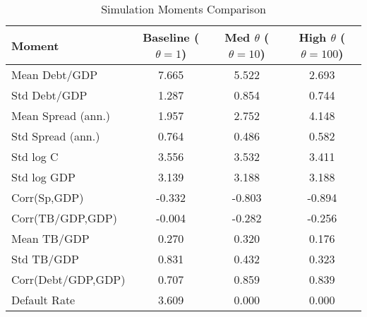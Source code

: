 \documentclass{article}
\begin{document}
\begin{table}[htbp]
\centering
\caption{Simulation Moments Comparison}
\begin{tabular}{lccc}
\toprule
Moment & Baseline ($\theta=1$) & Med $\theta$ ($\theta=10$) & High $\theta$ ($\theta=100$) \\
\midrule
Mean Debt/GDP             &    7.665 &    5.522 &    2.693 \\
Std Debt/GDP              &    1.287 &    0.854 &    0.744 \\
Mean Spread (ann.)        &    1.957 &    2.752 &    4.148 \\
Std Spread (ann.)         &    0.764 &    0.486 &    0.582 \\
Std log C                 &    3.556 &    3.532 &    3.411 \\
Std log GDP               &    3.139 &    3.188 &    3.188 \\
Corr(Sp,GDP)              &   -0.332 &   -0.803 &   -0.894 \\
Corr(TB/GDP,GDP)          &   -0.004 &   -0.282 &   -0.256 \\
Mean TB/GDP               &    0.270 &    0.320 &    0.176 \\
Std TB/GDP                &    0.831 &    0.432 &    0.323 \\
Corr(Debt/GDP,GDP)        &    0.707 &    0.859 &    0.839 \\
Default Rate              &    3.609 &    0.000 &    0.000 \\
\bottomrule
\end{tabular}
\end{table}
\end{document}
